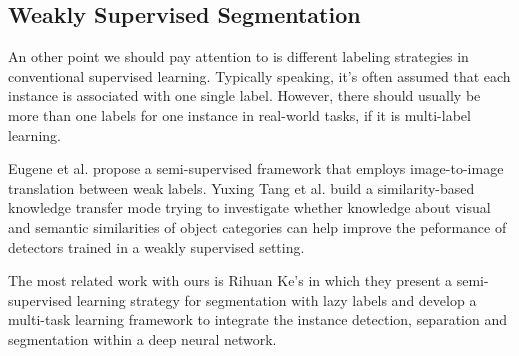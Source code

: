 \documentclass[10pt,twocolumn,letterpaper]{article}
\begin{document}
\subsection{Weakly Supervised Segmentation}
An other point we should pay attention to is different labeling strategies in conventional supervised learning.
Typically speaking, it's often assumed that each instance is associated with one single label. However, there should usually be more than one labels for one instance in real-world tasks, if it is multi-label learning.



Eugene et al. propose a semi-supervised framework that employs image-to-image translation between weak labels.
Yuxing Tang et al. build a similarity-based knowledge transfer mode trying to investigate whether knowledge about visual and semantic similarities of object categories can help improve the peformance of detectors trained in a weakly supervised setting.

The most related work with ours is Rihuan Ke's\cite{ke2019multi} in which they present a semi-supervised learning strategy for segmentation with lazy labels and develop a multi-task learning framework to integrate the instance detection, separation and segmentation within a deep neural network.
\end{document}
